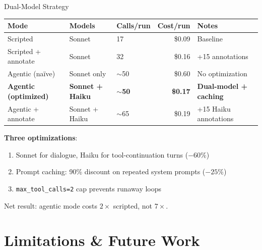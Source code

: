 \documentclass[aspectratio=169, 11pt]{beamer}
\begin{document}
\begin{frame}{Dual-Model Strategy}
\small
\begin{tabular}{@{}lllrl@{}}
\toprule
\textbf{Mode} & \textbf{Models} & \textbf{Calls/run} & \textbf{Cost/run} & \textbf{Notes} \\
\midrule
Scripted & Sonnet & 17 & \$0.09 & Baseline \\
Scripted + annotate & Sonnet & 32 & \$0.16 & +15 annotations \\
Agentic (na\"ive) & Sonnet only & $\sim$50 & \$0.60 & No optimization \\
\textbf{Agentic (optimized)} & \textbf{Sonnet + Haiku} & \textbf{$\sim$50} & \textbf{\$0.17} & \textbf{Dual-model + caching} \\
Agentic + annotate & Sonnet + Haiku & $\sim$65 & \$0.19 & +15 Haiku annotations \\
\bottomrule
\end{tabular}

\vspace{1em}
\textbf{Three optimizations}:
\begin{enumerate}
    \item Sonnet for dialogue, Haiku for tool-continuation turns ($-60\%$)
    \item Prompt caching: 90\% discount on repeated system prompts ($-25\%$)
    \item \texttt{max\_tool\_calls=2} cap prevents runaway loops
\end{enumerate}

\vspace{0.5em}
Net result: agentic mode costs $2\times$ scripted, not $7\times$.
\end{frame}

\section{Limitations \& Future Work}
\end{document}
